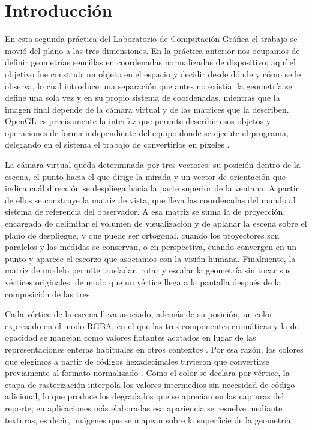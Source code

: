 
\section{Introducción}
En esta segunda práctica del Laboratorio de Computación Gráfica el trabajo se movió del plano a las tres dimensiones. En la práctica anterior nos ocupamos de definir geometrías sencillas en coordenadas normalizadas de dispositivo; aquí el objetivo fue construir un objeto en el espacio y decidir desde dónde y cómo se le observa, lo cual introduce una separación que antes no existía: la geometría se define una sola vez y en su propio sistema de coordenadas, mientras que la imagen final depende de la cámara virtual y de las matrices que la describen. OpenGL es precisamente la interfaz que permite describir esos objetos y operaciones de forma independiente del equipo donde se ejecute el programa, delegando en el sistema el trabajo de convertirlos en píxeles \cite{grantmestrength_opengl}.

La cámara virtual queda determinada por tres vectores: su posición dentro de la escena, el punto hacia el que dirige la mirada y un vector de orientación que indica cuál dirección se despliega hacia la parte superior de la ventana. A partir de ellos se construye la matriz de vista, que lleva las coordenadas del mundo al sistema de referencia del observador. A esa matriz se suma la de proyección, encargada de delimitar el volumen de visualización y de aplanar la escena sobre el plano de despliegue, y que puede ser ortogonal, cuando los proyectores son paralelos y las medidas se conservan, o en perspectiva, cuando convergen en un punto y aparece el escorzo que asociamos con la visión humana. Finalmente, la matriz de modelo permite trasladar, rotar y escalar la geometría sin tocar sus vértices originales, de modo que un vértice llega a la pantalla después de la composición de las tres.

Cada vértice de la escena lleva asociado, además de su posición, un color expresado en el modo RGBA, en el que las tres componentes cromáticas y la de opacidad se manejan como valores flotantes acotados en lugar de las representaciones enteras habituales en otros contextos \cite{microsoft_rgba}. Por esa razón, los colores que elegimos a partir de códigos hexadecimales tuvieron que convertirse previamente al formato normalizado \cite{convertcolor_rgba}. Como el color se declara por vértice, la etapa de rasterización interpola los valores intermedios sin necesidad de código adicional, lo que produce los degradados que se aprecian en las capturas del reporte; en aplicaciones más elaboradas esa apariencia se resuelve mediante texturas, es decir, imágenes que se mapean sobre la superficie de la geometría \cite{uv_texturas}.

